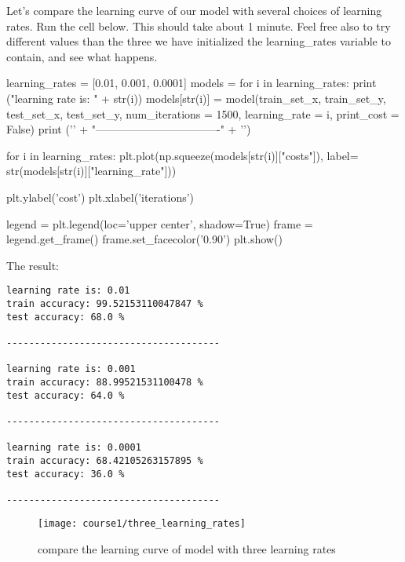 {{Let's compare the learning curve of our model with several choices of learning rates. Run the cell below. This should take about 1 minute. Feel free also to try different values than the three we have initialized the learning\_rates variable to contain, and see what happens.

\begin{mypython}
learning_rates = [0.01, 0.001, 0.0001]
models = {}
for i in learning_rates:
    print ("learning rate is: " + str(i))
    models[str(i)] = model(train_set_x, train_set_y, test_set_x, test_set_y, num_iterations = 1500, learning_rate = i, print_cost = False)
    print ('\n' + "----------------------------------" + '\n')

for i in learning_rates:
    plt.plot(np.squeeze(models[str(i)]["costs"]), label= str(models[str(i)]["learning_rate"]))

plt.ylabel('cost')
plt.xlabel('iterations')

legend = plt.legend(loc='upper center', shadow=True)
frame = legend.get_frame()
frame.set_facecolor('0.90')
plt.show()
\end{mypython}


The result:
\begin{verbatim}
learning rate is: 0.01
train accuracy: 99.52153110047847 %
test accuracy: 68.0 %

--------------------------------------

learning rate is: 0.001
train accuracy: 88.99521531100478 %
test accuracy: 64.0 %

--------------------------------------

learning rate is: 0.0001
train accuracy: 68.42105263157895 %
test accuracy: 36.0 %

--------------------------------------
\end{verbatim}

\begin{figure}[h]
\begin{center}
\texttt{[image: course1/three\_learning\_rates]}
\end{center}
\caption{compare the learning curve of model with three learning rates}
\label{three_learning_rates}
\end{figure}

}}
